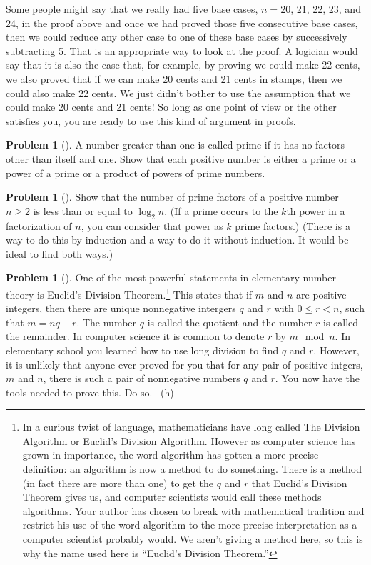 \documentclass[10pt,]{book}
\theoremstyle{plain}
\theoremstyle{definition}
\newtheorem{activity}[project]{Problem}
\theoremstyle{definition}
\numberwithin{equation}{chapter}
\newcommand{\lt}{<}
\begin{document}
\par
\hypertarget{p-2026}{}%
Some people might say that we really had five base cases, \(n=20\), 21, 22, 23, and 24, in the proof above and once we had proved those five consecutive base cases, then we could reduce any other case to one of these base cases by successively subtracting 5. That is an appropriate way to look at the proof. A logician would say that it is also the case that, for example, by proving we could make 22 cents, we also proved that if we can make 20 cents and 21 cents in stamps, then we could also make 22 cents. We just didn't bother to use the assumption that we could make 20 cents and 21 cents! So long as one point of view or the other satisfies you, you are ready to use this kind of argument in proofs.%
\begin{activity}[]\marginsymbol[-1em]{} \label{activity-368}
\hypertarget{p-2027}{}%
A number greater than one is called prime if it has no factors other than itself and one. Show that each positive number is either a prime or a power of a prime or a product of powers of prime numbers.%
\end{activity}
\begin{activity}[]\marginsymbol[-1em]{} \label{activity-369}
\hypertarget{p-2029}{}%
Show that the number of prime factors of a positive number \(n\ge 2\) is less than or equal to \(\log_2 n\).  (If a prime occurs to the \(k\)th power in a factorization of \(n\), you can consider that power as \(k\) prime factors.)  (There is a way to do this by induction and a way to do it without induction.  It would be ideal to find both ways.)%
\end{activity}
\begin{activity}[]\marginsymbol[-1em]{} \label{euclidsdivthm}
\hypertarget{p-2032}{}%
One of the most powerful statements in elementary number theory is Euclid's Division Theorem.\footnote{In a curious twist of language, mathematicians have long called The Division Algorithm or Euclid's Division Algorithm. However as computer science has grown in importance, the word algorithm has gotten a more precise definition: an algorithm is now a method to do something. There is a method (in fact there are more than one) to get the \(q\) and \(r\) that Euclid's Division Theorem gives us, and computer scientists would call these methods algorithms. Your author has chosen to break with mathematical tradition and restrict his use of the word algorithm to the more precise interpretation as a computer scientist probably would. We aren't giving a method here, so this is why the name used here is ``Euclid's Division Theorem.''\label{fn-25}} This states that if \(m\) and \(n\) are positive integers, then there are unique nonnegative intergers \(q\) and \(r\) with \(0 \le r \lt n\), such that \(m = nq + r\). The number \(q\) is called the quotient and the number \(r\) is called the remainder. In computer science it is common to denote \(r\) by \(m \mod n\). In elementary school you learned how to use long division to find \(q\) and \(r\). However, it is unlikely that anyone ever proved for you that for any pair of positive intgers, \(m\) and \(n\), there is such a pair of nonnegative numbers \(q\) and \(r\). You now have the tools needed to prove this. Do so.%
~{\tiny (h)}\end{activity}
\end{document}
